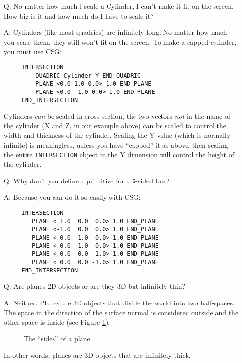 \begin{itemize}
\item[Q:] No matter how much I scale a Cylinder, I can't make it fit on the
screen.  How big is it and how much do I have to
scale it?
\item[A:] Cylinders (like most quadrics) are infinitely long.  No matter how
much you scale them, they still won't fit on the screen.  To make a
capped cylinder, you must use CSG:
\begin{verbatim}
     INTERSECTION
         QUADRIC Cylinder_Y END_QUADRIC
         PLANE <0.0 1.0 0.0> 1.0 END_PLANE
         PLANE <0.0 -1.0 0.0> 1.0 END_PLANE
     END_INTERSECTION
\end{verbatim}
Cylinders {\em can} be scaled in cross-section, the two vectors
{\em not} in the name of the cylinder (X and Z, in our example above) can
be scaled to control the width and thickness of the cylinder.  Scaling
the Y value (which is normally infinite) is meaningless, unless you
have ``capped'' it as above, then scaling the entire
{\tt INTERSECTION} object in the Y dimension
will control the height of the cylinder.

\item[Q:] Why don't you define a primitive for a
6-sided box?
\item[A:] Because you can do it so easily with
CSG:
\begin{verbatim}
     INTERSECTION
        PLANE < 1.0  0.0  0.0> 1.0 END_PLANE
        PLANE <-1.0  0.0  0.0> 1.0 END_PLANE
        PLANE < 0.0  1.0  0.0> 1.0 END_PLANE
        PLANE < 0.0 -1.0  0.0> 1.0 END_PLANE
        PLANE < 0.0  0.0  1.0> 1.0 END_PLANE
        PLANE < 0.0  0.0 -1.0> 1.0 END_PLANE
     END_INTERSECTION
\end{verbatim}

\item[Q:] Are planes 2D objects or are they 3D but infinitely thin?
\item[A:] Neither.  Planes are 3D objects that divide the world into two
half-spaces.
The space in the direction of the surface normal is considered outside
and the other space is inside (see Figure \ref{plane}).
\begin{figure}[htbp]
\begin{centering}

\caption{The ``sides'' of a plane}
\label{plane}
\end{centering}
\end{figure}
In other words, planes are 3D objects that are infinitely thick.


\end{itemize}
